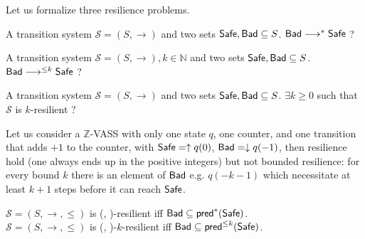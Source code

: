   



Let us formalize three resilience problems.


{A transition system $\mathscr{S}=(S,\rightarrow)$ and two sets $\textsf{Safe}, \textsf{Bad} \subseteq S$.}
{$\textsf{Bad} \longrightarrow^{*} \textsf{Safe}$ ?\newline}
%

%

{A transition system $\mathscr{S}=(S,\rightarrow), k \in \mathbb{N}$ and two sets $\textsf{Safe}, \textsf{Bad} \subseteq S$.}
{$\textsf{Bad} \longrightarrow^{\leq k} \textsf{Safe}$ ?\newline}

{A transition system $\mathscr{S}=(S,\rightarrow)$ and two sets $\textsf{Safe}, \textsf{Bad} \subseteq S$.}
{$\exists k \geq 0$ such that $\mathscr{S}$ is %
 $k$-resilient ?\newline}


\begin{example}
Let us consider a $\mathds{Z}$-VASS with only one state $q$, one counter, and one transition that adds $+1$ to the counter, with $\textsf{Safe} = \uparrow q(0)$, $\textsf{Bad} = \downarrow q(-1)$,
then resilience hold (one always ends up in the positive integers) but not bounded resilience: for every bound $k$ there is an element of $\textsf{Bad}$ e.g. $q(-k-1)$ which necessitate at least $k+1$ steps before it can reach $\textsf{Safe}$. 
\end{example}


\begin{remark}[Reformulation]\label{reformulation}
$\mathscr{S}=(S,\rightarrow,\leq)$ is %
(\Safe, \Bad)-resilient iff $\textsf{Bad} \subseteq \textsf{pred}^*(\textsf{Safe})$.\\
$\mathscr{S}=(S,\rightarrow,\leq)$ is %
(\Safe, \Bad)-$k$-resilient iff $\textsf{Bad} \subseteq \textsf{pred}^{\leq k}(\textsf{Safe})$.
\end{remark}

